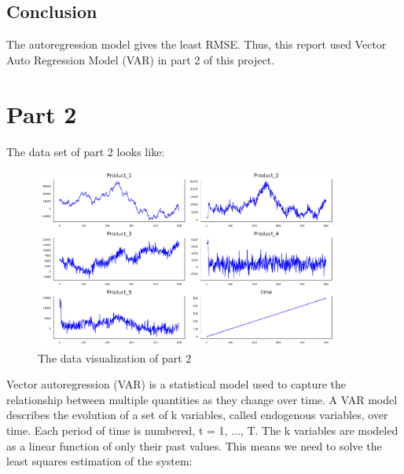\documentclass{article}
\begin{document}
\subsection{Conclusion}
The autoregression model gives the least RMSE. Thus, this report used Vector Auto Regression Model (VAR) in part 2 of this project. 

\section{Part 2}
The data set of part 2 looks like:
\begin{figure}[htbp]\centering
	\includegraphics[width=10cm]{Part2.png}
	\caption{The data visualization of part 2}
	\label{fig: VAR}
\end{figure}
Vector autoregression (VAR) is a statistical model used to capture the relationship between multiple quantities as they change over time. A VAR model describes the evolution of a set of k variables, called endogenous variables, over time. Each period of time is numbered, t = 1, ..., T. The k variables are modeled as a linear function of only their past values.
This means we need to solve the least squares estimation of the system:
\end{document}
